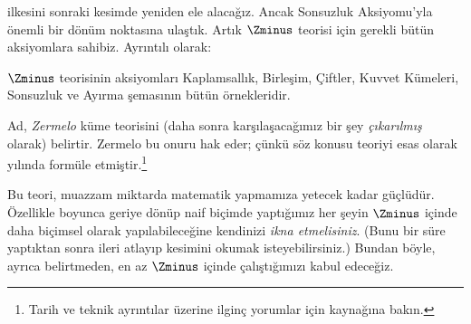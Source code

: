 


\stagesinf{} ilkesini sonraki kesimde yeniden ele alacağız. Ancak Sonsuzluk
Aksiyomu'yla önemli bir dönüm noktasına ulaştık. Artık $\Zminus$ teorisi
için gerekli bütün aksiyomlara sahibiz. Ayrıntılı olarak:

\begin{defn}
$\Zminus$ teorisinin aksiyomları Kaplamsallık, Birleşim, Çiftler, Kuvvet
Kümeleri, Sonsuzluk ve Ayırma şemasının bütün örnekleridir.
\end{defn}

Ad, \emph{Zermelo} küme teorisini (daha sonra karşılaşacağımız bir şey
\emph{çıkarılmış} olarak) belirtir. Zermelo bu onuru hak eder; çünkü söz
konusu teoriyi esas olarak \citeyear{Zermelo1908Untersuchungen} yılında
formüle etmiştir.\footnote{Tarih ve teknik ayrıntılar üzerine ilginç
yorumlar için \citet[Ek A]{Potter2004} kaynağına bakın.}

Bu teori, muazzam miktarda matematik yapmamıza yetecek kadar güçlüdür.
Özellikle  boyunca geriye dönüp naif biçimde
yaptığımız her şeyin $\Zminus$ içinde daha biçimsel olarak yapılabileceğine
kendinizi \emph{ikna etmelisiniz}. (Bunu bir süre yaptıktan sonra ileri
atlayıp  kesimini okumak
isteyebilirsiniz.) Bundan böyle, ayrıca belirtmeden, en az $\Zminus$
içinde çalıştığımızı kabul edeceğiz.

